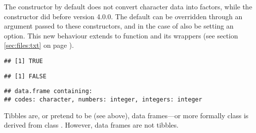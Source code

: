 \documentclass[krantz2]{krantz}\usepackage{knitr}
\begin{document}
The  constructor by default does not convert character data into factors, while the  constructor did before \Rlang version 4.0.0. The default can be overridden through an argument passed to these constructors, and in the case of  also be setting an \Rlang option. This new behaviour extends to function  and its wrappers (see section \ref{sec:files:txt} on page \pageref{sec:files:txt}).

\begin{knitrout}\footnotesize
{}\color{fgcolor}\begin{kframe}
\begin{alltt}
 \hlkwb{<-} \hlstd{(} \hlstd{=} \hlstd{(}\hlstd{,} \hlstd{,} \hlstd{),}  \hlstd{=} \hlopt{:}\hlstd{,}  \hlstd{=} \hlopt{:}\hlstd{)}
\end{alltt}
\begin{verbatim}
## [1] TRUE
\end{verbatim}
\begin{alltt}
\end{alltt}
\begin{verbatim}
## [1] FALSE
\end{verbatim}
\begin{alltt}
\end{alltt}
\begin{verbatim}
## data.frame containing:
## codes: character, numbers: integer, integers: integer
\end{verbatim}
\end{kframe}
\end{knitrout}

Tibbles are, or pretend to be (see above), data frames---or more formally class  is derived from class . However, data frames are not tibbles.
\end{document}
